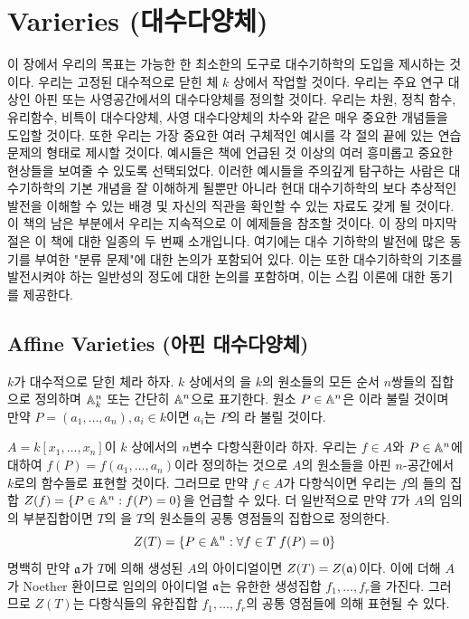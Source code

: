 	
	\chapter{Varieries (대수다양체)}
	
	이 장에서 우리의 목표는 가능한 한 최소한의 도구로 대수기하학의 도입을 제시하는 것이다.
	우리는 고정된 대수적으로 닫힌 체 $k$ 상에서 작업할 것이다.
	우리는 주요 연구 대상인 아핀 또는 사영공간에서의 대수다양체를 정의할 것이다.
	우리는 차원, 정칙 함수, 유리함수, 비특이 대수다양체, 사영 대수다양체의 차수와 같은 매우 중요한 개념들을 도입할 것이다.
	또한 우리는 가장 중요한 여러 구체적인 예시를 각 절의 끝에 있는 연습문제의 형태로 제시할 것이다.
	예시들은 책에 언급된 것 이상의 여러 흥미롭고 중요한 현상들을 보여줄 수 있도록 선택되었다.
	이러한 예시들을 주의깊게 탐구하는 사람은 대수기하학의 기본 개념을 잘 이해하게 될뿐만 아니라
	현대 대수기하학의 보다 추상적인 발전을 이해할 수 있는 배경 및 자신의 직관을 확인할 수 있는 자료도 갖게 될 것이다.
	이 책의 남은 부분에서 우리는 지속적으로 이 예제들을 참조할 것이다.
	이 장의 마지막 절은 이 책에 대한 일종의 두 번째 소개입니다.
	여기에는 대수 기하학의 발전에 많은 동기를 부여한 "분류 문제"에 대한 논의가 포함되어 있다.
	이는 또한 대수기하학의 기초를 발전시켜야 하는 일반성의 정도에 대한 논의를 포함하며, 이는 스킴 이론에 대한 동기를 제공한다.
	
	
	\section{Affine Varieties (아핀 대수다양체)}
	
	$k$가 대수적으로 닫힌 체라 하자. $k$ 상에서의 을
	$k$의 원소들의 모든 순서 $n$쌍들의 집합으로 정의하며 $\mathbb{A}_k^n$ 또는 간단히 $\mathbb{A}^n$으로 표기한다.
	원소 $P\in\mathbb{A}^n$은 이라 불릴 것이며 만약 $P=(a_1,\ldots,a_n),a_i\in k$이면
	$a_i$는 $P$의 라 불릴 것이다.
	
	$A=k[x_1,\ldots,x_n]$이 $k$ 상에서의 $n$변수 다항식환이라 하자.
	우리는 $f\in A$와 $P\in\mathbb{A}^n$에 대하여 $f(P)=f(a_1,\ldots,a_n)$이라 정의하는 것으로
	$A$의 원소들을 아핀 $n$-공간에서 $k$로의 함수들로 표현할 것이다.	
	그러므로 만약 $f\in A$가 다항식이면 우리는 $f$의 들의 집합 $Z(f)=\{P\in\mathbb{A}^n:f(P)=0\}$을 언급할 수 있다.
	더 일반적으로 만약 $T$가 $A$의 임의의 부분집합이면 $T$의 을 $T$의 원소들의 공통 영점들의 집합으로 정의한다.
	$$Z(T)=\{P\in\mathbb{A}^n:\forall f\in T\;f(P)=0\}$$
	명백히 만약 $\mathfrak{a}$가 $T$에 의해 생성된 $A$의 아이디얼이면 $Z(T)=Z(\mathfrak{a})$이다.
	이에 더해 $A$가 Noether 환이므로 임의의 아이디얼 $\mathfrak{a}$는 유한한 생성집합 $f_1,\ldots,f_r$을 가진다.
	그러므로 $Z(T)$는 다항식들의 유한집합 $f_1,\ldots,f_r$의 공통 영점들에 의해 표현될 수 있다.
	
